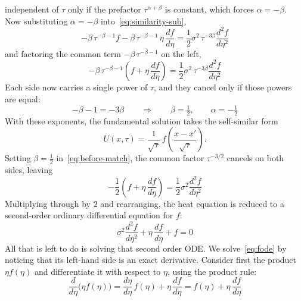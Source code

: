 \documentclass[a4paper,12pt]{article}
\numberwithin{equation}{section}
\begin{document}
independent of $\tau$ only if the prefactor $\tau^{\alpha+\beta}$ is constant,
which forces $\alpha = -\beta$. Now substituting $\alpha = -\beta$ into~\eqref{eq:similarity-sub},
\begin{equation}\label{eq:sub-ab}
  -\beta\,\tau^{-\beta-1} f
  - \beta\,\tau^{-\beta-1}\,\eta\,\frac{df}{d\eta}
    = \frac{1}{2}\sigma^{2}\,\tau^{-3\beta}\frac{d^2 f}{d\eta^2}
\end{equation}
and factoring the common term $-\beta\,\tau^{-\beta-1}$ on the left,
\begin{equation}\label{eq:before-match}
  -\beta\,\tau^{-\beta-1}\left(f + \eta\,\frac{df}{d\eta}\right)
    = \frac{1}{2}\sigma^{2}\,\tau^{-3\beta}\frac{d^2 f}{d\eta^2}
\end{equation}
Each side now carries a single power of $\tau$, and they cancel only if those
powers are equal:
\begin{equation}\label{eq:match}
  -\beta - 1 = -3\beta
  \qquad\Longrightarrow\qquad
  \beta = \tfrac{1}{2}, \qquad \alpha = -\tfrac{1}{2}
\end{equation}
With these exponents, the fundamental solution takes the self-similar form
\begin{equation}\label{eq:Uform}
  U(x,\tau) = \frac{1}{\sqrt{\tau}}\,
    f\!\left(\frac{x - x'}{\sqrt{\tau}}\right).
\end{equation}
Setting $\beta = \tfrac{1}{2}$ in~\eqref{eq:before-match}, the common factor
$\tau^{-3/2}$ cancels on both sides, leaving
\begin{equation}\label{eq:ode-half}
  -\frac{1}{2}\left(f + \eta\,\frac{df}{d\eta}\right)
    = \frac{1}{2}\sigma^{2}\frac{d^2 f}{d\eta^2}
\end{equation}
Multiplying through by $2$ and rearranging, the heat equation is reduced to a
second-order ordinary differential equation for $f$:
\begin{equation}\label{eq:fode}
    \sigma^{2}\frac{d^2 f}{d\eta^2}
    + \eta\,\frac{df}{d\eta}
    + f = 0
\end{equation}
All that is left to do is solving that second order ODE. We solve~\eqref{eq:fode} by noticing that its left-hand side is an exact
derivative. Consider first the product $\eta f(\eta)$ and differentiate it with
respect to $\eta$, using the product rule:
\begin{equation}\label{eq:productrule}
  \frac{d}{d\eta}\big(\eta f(\eta)\big)
    = \frac{d\eta}{d\eta}\,f(\eta) + \eta\,\frac{df}{d\eta}
    = f(\eta) + \eta\,\frac{df}{d\eta} 
\end{equation}
\end{document}
